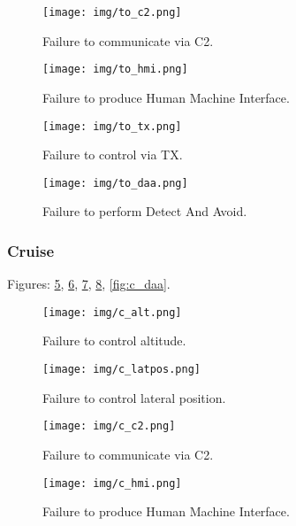 \documentclass[10pt,a4paper]{report}
\begin{document}
\begin{figure}[h!]
    \centering
    \texttt{[image: img/to\_c2.png]}
    \caption{Failure to communicate via C2.}
    \label{fig:to_c2}
\end{figure}

\begin{figure}[h!]
    \centering
    \texttt{[image: img/to\_hmi.png]}
    \caption{Failure to produce Human Machine Interface.}
    \label{fig:to_hmi}
\end{figure}

\begin{figure}[h!]
    \centering
    \texttt{[image: img/to\_tx.png]}
    \caption{Failure to control via TX.}
    \label{fig:to_tx}
\end{figure}

\begin{figure}[h!]
    \centering
    \texttt{[image: img/to\_daa.png]}
    \caption{Failure to perform Detect And Avoid.}
    \label{fig:to_daa}
\end{figure}

\subsubsection{Cruise}

Figures: \ref{fig:c_alt}, \ref{fig:c_latpos}, \ref{fig:c_c2}, \ref{fig:c_hmi}, \ref{fig:c_daa}.

\begin{figure}[h!]
    \centering
    \texttt{[image: img/c\_alt.png]}
    \caption{Failure to control altitude.}
    \label{fig:c_alt}
\end{figure}

\begin{figure}[h]
    \centering
    \texttt{[image: img/c\_latpos.png]}
    \caption{Failure to control lateral position.}
    \label{fig:c_latpos}
\end{figure}

\begin{figure}[h!]
    \centering
    \texttt{[image: img/c\_c2.png]}
    \caption{Failure to communicate via C2.}
    \label{fig:c_c2}
\end{figure}

\begin{figure}[h!]
    \centering
    \texttt{[image: img/c\_hmi.png]}
    \caption{Failure to produce Human Machine Interface.}
    \label{fig:c_hmi}
\end{figure}
\end{document}
